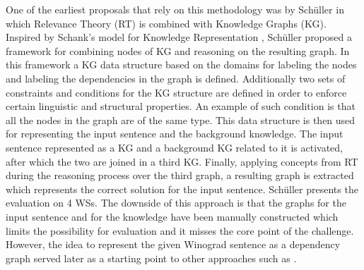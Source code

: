 One of the earliest proposals that rely on this methodology was by Sch{\"u}ller \cite{DBLP:conf/kr/Schuller14} in which Relevance Theory (RT) \cite{Wilson2002-WILRT} is combined with Knowledge Graphs (KG). Inspired by Schank's model for Knowledge Representation \cite{SCHANK1972552}, Sch{\"u}ller proposed a framework for combining nodes of KG and reasoning on the resulting graph. 
In this framework a KG data structure based on the domains for labeling the nodes and labeling the dependencies in the graph is defined. Additionally two sets of constraints and conditions for the KG structure are defined in order to enforce certain linguistic and structural properties. An example of such condition is that all the nodes in the graph are of the same type.  This data structure is then used for representing the input sentence and the background knowledge. 
The input sentence represented as a KG and a background KG related to it is activated, after which the two are joined in a third KG. Finally, applying concepts from RT during the reasoning process over the third graph, a resulting graph is extracted which represents the correct solution for the input sentence. Sch{\"u}ller \cite{DBLP:conf/kr/Schuller14} presents the evaluation on 4 WSs. The downside of this approach is that the graphs for the input sentence and for the knowledge have been manually constructed which limits the possibility for evaluation and it misses the core point of the challenge. However, the idea to represent the given Winograd sentence as a dependency graph served later as a starting point to other approaches such as \cite{DBLP:conf/ijcai/SharmaVAB15}.

